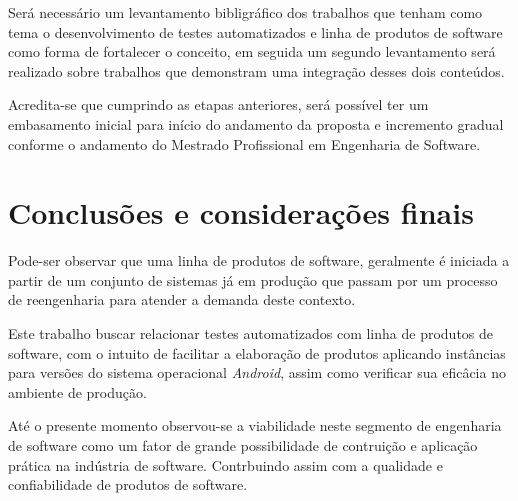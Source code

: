 \documentclass[12pt,a4paper]{article}
\begin{document}
Será necessário um levantamento bibligráfico dos trabalhos que tenham como tema o desenvolvimento de testes automatizados e linha de produtos de software como forma de fortalecer o conceito, em seguida um segundo levantamento será realizado sobre trabalhos que demonstram uma integração desses dois conteúdos.

Acredita-se que cumprindo as etapas anteriores, será possível ter um embasamento inicial para início do andamento da proposta e incremento gradual conforme o andamento do Mestrado Profissional em Engenharia de Software.

\section{Conclusões e considerações finais}
Pode-ser observar que uma linha de produtos de software, geralmente é iniciada a partir de um conjunto de sistemas já em produção que passam por um processo de reengenharia para atender a demanda deste contexto.

Este trabalho buscar relacionar testes automatizados com linha de produtos de software, com o intuito de facilitar a elaboração de produtos aplicando instâncias para versões do sistema operacional \textit{Android}, assim como verificar sua eficâcia no ambiente de produção.

Até o presente momento observou-se a viabilidade neste segmento de engenharia de software como um fator de grande possibilidade de contruição e aplicação prática na indústria de software. Contrbuindo assim com a qualidade e confiabilidade de produtos de software. 


\end{document}
